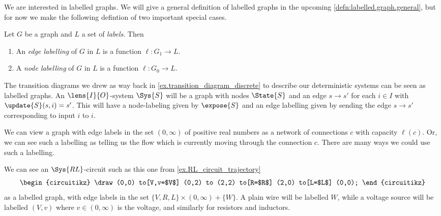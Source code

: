 \documentclass[DynamicalBook]{subfiles}
\begin{document}
We are interested in labelled graphs. We will give a general definition of labelled graphs in the upcoming \cref{defn:labelled.graph.general}, but for now we make the following defintion of two important special cases.
\begin{definition}\label{defn:labelled.graph}
  Let $G$ be a graph and $L$ a set of \emph{labels}. Then
  \begin{enumerate}
          \item An \emph{edge labelling} of $G$ in $L$ is a function $\ell : G_{1} \to L$.
         \item A \emph{node labelling} of $G$ in $L$ is a function $\ell : G_{0} \to L$.
  \end{enumerate}
\end{definition}

\begin{example}\label{ex:transition.system.labelled.graph}
The transition diagrams we drew as way back in \cref{ex.transition_diagram_discrete} to describe our deterministic systems can be seen as labelled graphs. An $\lens{I}{O}$-system $\Sys{S}$ will be a graph with nodes $\State{S}$ and an edge $s \to s'$ for each $i \in I$ with $\update{S}(s, i) = s'$. This will have a node-labeling given by $\expose{S}$ and an edge labelling given by sending the edge $s \to s'$ corresponding to input $i$ to $i$.
  \end{example}

\begin{example}
We can view a graph with edge labels in the set $(0, \infty)$ of positive real numbers as a network of connections $c$ with capacity $\ell(c)$. Or, we can see such a labelling as telling us the flow which is currently moving through the connection $c$. There are many ways we could use such a labelling.
  \end{example}

  \begin{example}
We can see an $\Sys{RL}$-circuit such as this one from \cref{ex.RL_circuit_trajectory}
  \[
    \begin{circuitikz}
      \draw (0,0)
      to[V,v=$V$] (0,2) %
      to (2,2)
      to[R=$R$] (2,0) %
      to[L=$L$] (0,0);
    \end{circuitikz}
  \]
  as a labelled graph, with edge labels in the set $\{V, R, L\} \times (0, \infty) + \{W\}$. A plain wire will be labelled $W$, while a voltage source will be labelled $(V, v)$ where $v \in (0, \infty)$ is the voltage, and similarly for resistors and inductors.
  \end{example}
\end{document}
